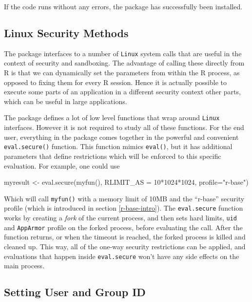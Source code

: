 \documentclass[article]{jss}
\newcommand{\R}{\textsf{R}\xspace}
\newcommand{\AppArmor}{\texttt{AppArmor}\xspace}
\newcommand{\RAppArmor}{\pkg{RAppArmor}\xspace}
\newcommand{\Linux}{\texttt{Linux}\xspace}
\begin{document}
If the code runs without any errors, the package has successfully been
installed.

\subsection{Linux Security Methods}

The \RAppArmor package interfaces to a number of \Linux system calls that
are useful in the context of security and sandboxing. The advantage of calling
these directly from \R is that we can dynamically set the parameters
from within the \R process, as opposed to fixing them for every
\R session. Hence it is actually possible to execute some parts of an
application in a different security context other parts, which can be useful in
large applications.

The package defines a lot of low level functions that wrap around \Linux
{} interfaces. However it is not required to study all of these
functions. For the end user, everything in the package comes together in the
powerful and convenient \texttt{eval.secure()} function. This function mimics
\texttt{eval()}, but it has additional parameters that define restrictions
which will be enforced to this specific evaluation. For example, one could use

\begin{CodeChunk}
\begin{CodeInput}
myresult <- eval.secure(myfun(), RLIMIT_AS = 10*1024*1024, profile="r-base")
\end{CodeInput}
\end{CodeChunk}

Which will call \texttt{myfun()} with a memory limit of 10MB and the ``r-base''
security profile (which is introduced in section \ref{r-base-intro}). The
\texttt{eval.secure} function works by creating a \emph{fork} of the current
process, and then sets hard limits, \texttt{uid} and \AppArmor profile on the
forked process, before evaluating the call. After the function returns, or when the
timeout is reached, the forked process is killed and cleaned up. This way, all
of the one-way security restrictions can be applied, and evaluations that
happen inside \texttt{eval.secure} won't have any side effects on the main
process.

\subsection{Setting User and Group ID}
\end{document}
